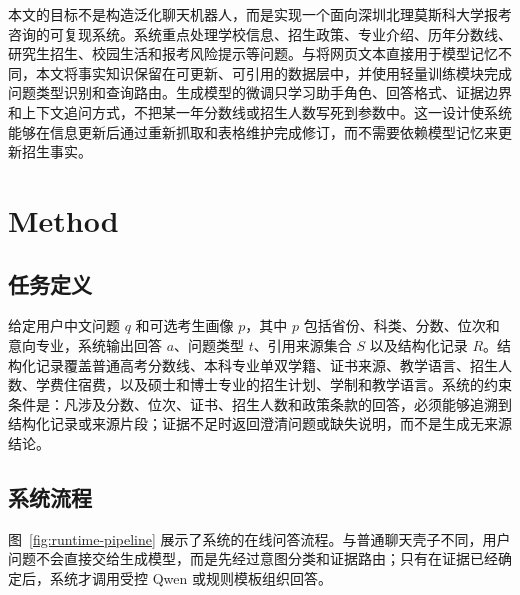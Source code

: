 \documentclass[UTF8,a4paper,11pt]{ctexart}
\begin{document}
本文的目标不是构造泛化聊天机器人，而是实现一个面向深圳北理莫斯科大学报考咨询的可复现系统。系统重点处理学校信息、招生政策、专业介绍、历年分数线、研究生招生、校园生活和报考风险提示等问题。与将网页文本直接用于模型记忆不同，本文将事实知识保留在可更新、可引用的数据层中，并使用轻量训练模块完成问题类型识别和查询路由。生成模型的微调只学习助手角色、回答格式、证据边界和上下文追问方式，不把某一年分数线或招生人数写死到参数中。这一设计使系统能够在信息更新后通过重新抓取和表格维护完成修订，而不需要依赖模型记忆来更新招生事实。

\section{Method}

\subsection{任务定义}

给定用户中文问题 $q$ 和可选考生画像 $p$，其中 $p$ 包括省份、科类、分数、位次和意向专业，系统输出回答 $a$、问题类型 $t$、引用来源集合 $S$ 以及结构化记录 $R$。结构化记录覆盖普通高考分数线、本科专业单双学籍、证书来源、教学语言、招生人数、学费住宿费，以及硕士和博士专业的招生计划、学制和教学语言。系统的约束条件是：凡涉及分数、位次、证书、招生人数和政策条款的回答，必须能够追溯到结构化记录或来源片段；证据不足时返回澄清问题或缺失说明，而不是生成无来源结论。

\subsection{系统流程}

图~\ref{fig:runtime-pipeline} 展示了系统的在线问答流程。与普通聊天壳子不同，用户问题不会直接交给生成模型，而是先经过意图分类和证据路由；只有在证据已经确定后，系统才调用受控 Qwen 或规则模板组织回答。
\end{document}
